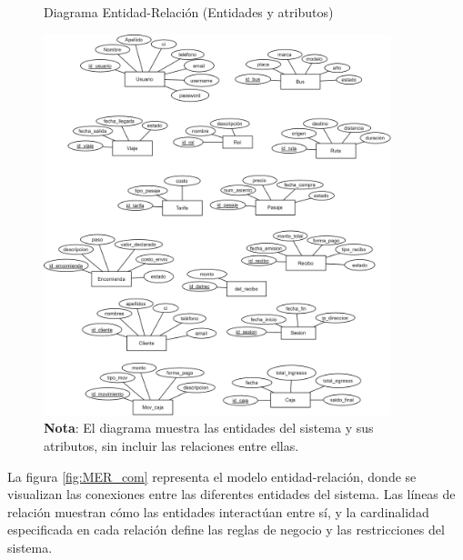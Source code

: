 	\begin{figure}[!h] %
		\caption[Diagrama Entidad-Relación ]
		{\newline Diagrama Entidad-Relación (Entidades y atributos)} %
		\vspace{0.3cm}
		\centering
		\includegraphics[width=0.9\textwidth]{imagenes/cap_3/MER_ent_atri.png} %
		\vspace{0.6cm}
			\caption*{\textup{\textbf{Nota}: El diagrama muestra las entidades del sistema y sus atributos, sin incluir las relaciones entre ellas.}}
		\vspace{-0.6cm}
		\label{fig:ent_atri} %
	\end{figure}
	
	La figura \ref{fig:MER_com} representa el modelo entidad-relación, donde se visualizan las conexiones entre las diferentes entidades del sistema. Las líneas de relación muestran cómo las entidades interactúan entre sí, y la cardinalidad especificada en cada relación define las reglas de negocio y las restricciones del sistema.
	
